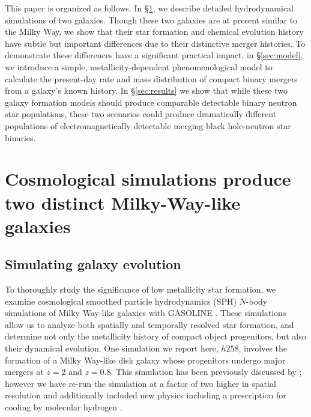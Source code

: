 \documentclass[nofootinbib,twocolumn,prd]{emulateapj}
\newcommand\editremark[1]{{\color{red}#1}}
\begin{document}
This paper is organized as follows. 
In \S \ref{sec:sims}, we describe detailed hydrodynamical simulations of  two galaxies.  Though these two
galaxies are at  present similar to the Milky Way, we
show that their star formation and chemical evolution history have subtle but important differences due to their
distinctive merger histories.   To demonstrate
these differences have a significant practical impact,  in \S \ref{sec:model}, we introduce a simple,
metallicity-dependent  phenomenological model to calculate the present-day rate and mass distribution of compact binary
mergers from  a galaxy's known history.  
In \S \ref{sec:results} we show that while these two galaxy formation models should produce comparable detectable binary neutron star
populations, these two scenarios could produce dramatically different populations of electromagnetically detectable
merging black hole-neutron star binaries. 
%






\section{Cosmological simulations produce two distinct Milky-Way-like galaxies}
\label{sec:sims}

\subsection{Simulating galaxy evolution}
To thoroughly study the significance of low metallicity star
formation, we examine cosmological smoothed particle hydrodynamics
(SPH) $N$-body simulations of Milky Way-like galaxies with GASOLINE
\citep{2001PhDT........21S,2004NewA....9..137W}.  These simulations allow us to analyze both
spatially and temporally resolved star formation, and determine not
only the metallicity history of compact object progenitors, but also
their dynamical evolution.  
One simulation we report here, $h258$,
involves the formation of a Milky Way-like disk galaxy whose
progenitors undergo major mergers at $z = 2$ and $z = 0.8$.  This
simulation has been previously discussed by
\citet{2009MNRAS.398..312G,2010ApJ...721L.148B,2011ApJ...742...13B,2011ApJ...728...51B}; however we have
re-run the simulation at a factor of two higher in spatial resolution
and additionally included new physics including a prescription for
cooling by molecular hydrogen \citet{2012MNRAS.425.3058C}.
\end{document}
